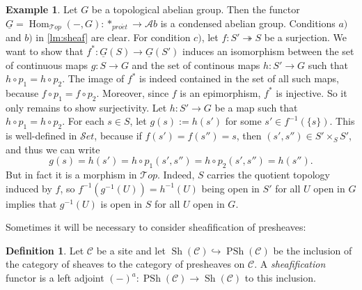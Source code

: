 \documentclass[11pt,A4]{article}
\theoremstyle{plain}
\theoremstyle{definition}
\newtheorem{defn}[thm]{Definition}
\newtheorem{exa}[thm]{Example}
\theoremstyle{remark}
\newcommand{\1}{\mathbbm{1}}
\newcommand{\C}{\mathscr{C}}
\newcommand{\Top}{\mathscr{T}op}
\newcommand{\Ab}{\mathscr{A}b}
\newcommand{\Set}{\mathscr{S}et}
\DeclareMathOperator{\Hom}{Hom}
\DeclareMathOperator{\PSh}{PSh}
\DeclareMathOperator{\Sh}{Sh}
\newcommand{\pe}{*_{pro\acute et}}
\renewcommand{\u}[1]{\underline{#1}}
\begin{document}
\begin{exa}
    Let $G$ be a topological abelian group. Then the functor $\u{G}=\Hom_{\Top}(-,G)\colon \pe\to \Ab$ is a condensed abelian group.
    Conditions $a)$ and $b)$ in \cref{lm:sheaf} are clear.
    For condition $c)$, let $f\colon S'\twoheadrightarrow S$ be a surjection.
    We want to show that $f^{*}\colon \u{G}(S)\to \u{G}(S')$ induces an isomorphism between the set of continuous maps $g\colon S\to G$ and the set of continous maps $h\colon S'\to G$ such that $h\circ p_{1}=h\circ p_{2}$.
    The image of $f^{*}$ is indeed contained in the set of all such maps, because $f\circ p_{1}=f\circ p_{2}$.
    Moreover, since $f$ is an epimorphism, $f^{*}$ is injective.
    So it only remains to show surjectivity.
    Let $h\colon S'\to G$ be a map such that $h\circ p_{1}=h\circ p_{2}$.
    For each $s\in S$, let $g(s):=h(s')$ for some $s'\in f^{-1}(\{s\})$.
    This is well-defined in $\Set$, because if $f(s')=f(s'')=s$, then $(s',s'')\in S'\times_{S}S'$, and thus we can write
    \[ g(s)=h(s')=h\circ p_{1}(s',s'')=h\circ p_{2}(s',s'')=h(s'').\]
    But in fact it is a morphism in $\Top$.
    Indeed, $S$ carries the quotient topology induced by $f$, so $f^{-1}(g^{-1}(U))=h^{-1}(U)$ being open in $S'$ for all $U$ open in $G$ implies that $g^{-1}(U)$ is open in $S$ for all $U$ open in $G$.
\end{exa}

Sometimes it will be necessary to consider sheafification of presheaves:

\begin{defn}
    Let $\C$ be a site and let $\Sh(\C)\hookrightarrow \PSh(\C)$ be the inclusion of the category of sheaves to the category of presheaves on $\C$. 
    A \textit{sheafification} functor is a left adjoint $(-)^{a}\colon \PSh(\C)\to \Sh(\C)$ to this inclusion.
\end{defn}
\end{document}
